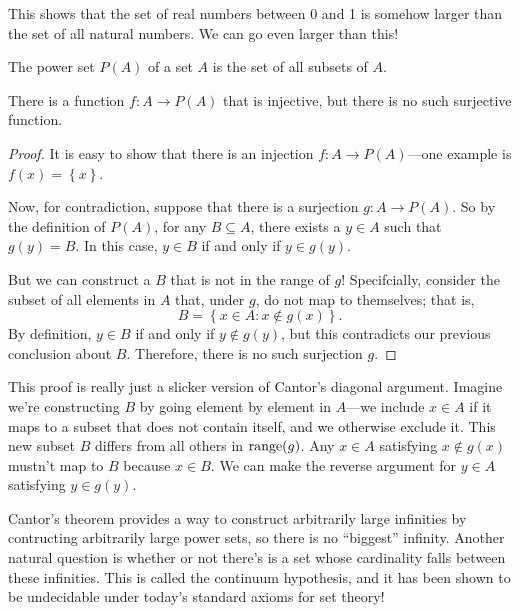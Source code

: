 \documentclass[../m131main.tex]{subfiles}
\begin{document}
This shows that the set of real numbers between 0 and 1 is somehow larger than the set of all natural numbers.
We can go even larger than this!

\begin{definition}
    The power set $P(A)$ of a set $A$ is the set of all subsets of $A$.
\end{definition}

\begin{theorem}
    There is a function $f : A \to P(A)$ that is injective, but there is no such surjective function.
\end{theorem}

\begin{proof}
    It is easy to show that there is an injection $f: A \to P(A)$---one example is $f(x) = \left\{ x \right\}$.

    Now, for contradiction, suppose that there is a surjection $g : A \to P(A)$.
    So by the definition of $P(A)$, for any $B \subseteq A$, there exists a $y \in A$ such that $g(y) = B$.
    In this case, $y \in B$ if and only if $y \in g(y)$.

    But we can construct a $B$ that is not in the range of $g$!
    Specifcially, consider the subset of all elements in $A$ that, under $g$, do not map to themselves; that is,
    \[ B = \left\{ x \in A : x \not\in g(x) \right\}. \]
    By definition, $y \in B$ if and only if $y \not\in g(y)$, but this contradicts our previous conclusion about $B$.
    Therefore, there is no such surjection $g$.
\end{proof}

This proof is really just a slicker version of Cantor's diagonal argument.
Imagine we're constructing $B$ by going element by element in $A$---we include $x \in A$ if it maps to a subset that does not contain itself, and we otherwise exclude it.
This new subset $B$ differs from all others in $\textrm{range}(g)$.
Any $x \in A$ satisfying $x \not\in g(x)$ mustn't map to $B$ because $x \in B$.
We can make the reverse argument for $y \in A$ satisfying $y \in g(y)$.

Cantor's theorem provides a way to construct arbitrarily large infinities by contructing arbitrarily large power sets, so there is no ``biggest'' infinity.
Another natural question is whether or not there's is a set whose cardinality falls between these infinities.
This is called the continuum hypothesis, and it has been shown to be undecidable under today's standard axioms for set theory!
\end{document}
